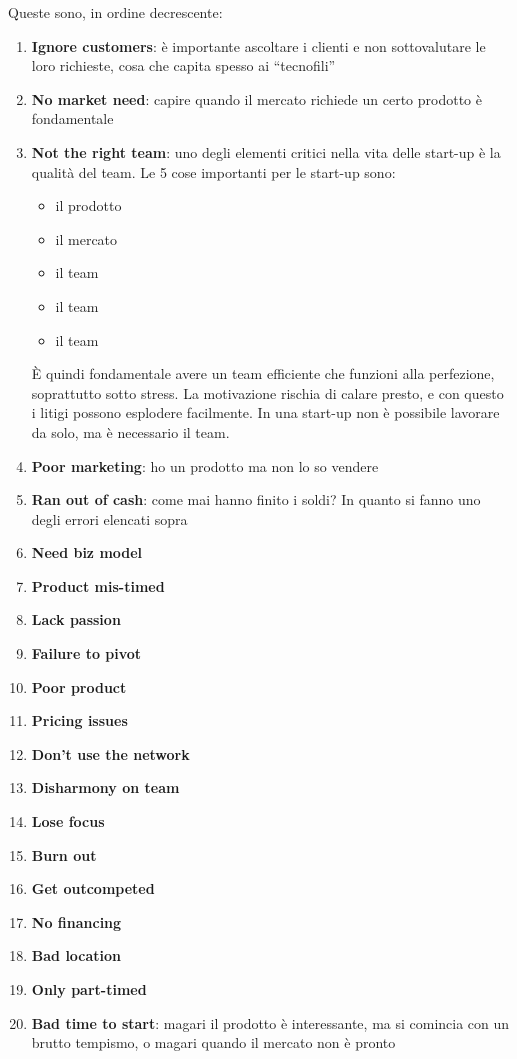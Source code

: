 Queste sono, in ordine decrescente:
\begin{enumerate}
 \item \textbf{Ignore customers}: è importante ascoltare i clienti e non
 sottovalutare le loro richieste, cosa che capita spesso ai ``tecnofili''
 \item \textbf{No market need}: capire quando il mercato richiede un certo
 prodotto è fondamentale
 \item \textbf{Not the right team}: uno degli elementi critici nella vita delle
start-up è la qualità del team. Le 5 cose importanti per le start-up sono:
\begin{itemize}
 \item il prodotto
 \item il mercato
 \item il team
 \item il team
 \item il team
\end{itemize}
  È quindi fondamentale avere un team efficiente che funzioni alla perfezione,
soprattutto sotto stress. La motivazione rischia di calare presto, e con questo
i litigi possono esplodere facilmente. In una start-up non è possibile lavorare
da solo, ma è necessario il team.
 \item \textbf{Poor marketing}: ho un prodotto ma non lo so vendere
 \item \textbf{Ran out of cash}: come mai hanno finito i soldi? In quanto si
 fanno uno degli errori elencati sopra
 \item \textbf{Need biz model}
 \item \textbf{Product mis-timed}
 \item \textbf{Lack passion}
 \item \textbf{Failure to pivot}
 \item \textbf{Poor product}
 \item \textbf{Pricing issues}
 \item \textbf{Don't use the network}
 \item \textbf{Disharmony on team}
 \item \textbf{Lose focus}
 \item \textbf{Burn out}
 \item \textbf{Get outcompeted}
 \item \textbf{No financing}
 \item \textbf{Bad location}
 \item \textbf{Only part-timed}
 \item \textbf{Bad time to start}: magari il prodotto è interessante, ma si
 comincia con un brutto tempismo, o magari quando il mercato non è pronto
\end{enumerate}

